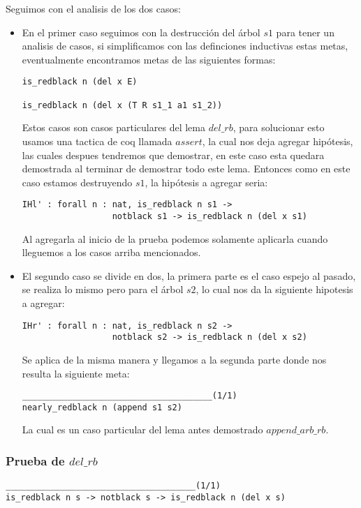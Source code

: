Seguimos con el analisis de los dos casos:
\begin{itemize}
  \item En el primer caso seguimos con la destrucci\'on del \'arbol $s1$ para tener un analisis de
  casos, si simplificamos con las definciones inductivas estas metas, eventualmente encontramos
  metas de las siguientes formas:
\begin{verbatim}
is_redblack n (del x E)

is_redblack n (del x (T R s1_1 a1 s1_2))
\end{verbatim}
  Estos casos son casos particulares del lema $del\_rb$, para solucionar esto usamos una tactica de
  coq llamada $assert$, la cual nos deja agregar hip\'otesis, las cuales despues tendremos que
  demostrar, en este caso esta quedara demostrada al terminar de demostrar todo este lema.
  Entonces como en este caso estamos destruyendo $s1$, la hip\'otesis a agregar seria:
\begin{verbatim}
IHl' : forall n : nat, is_redblack n s1 ->
                  notblack s1 -> is_redblack n (del x s1)
\end{verbatim}
  Al agregarla al inicio de la prueba podemos solamente aplicarla cuando lleguemos a los casos
  arriba mencionados.
  \item El segundo caso se divide en dos, la primera parte es el caso espejo al pasado, se realiza lo mismo pero para el \'arbol $s2$, lo cual nos da la siguiente hipotesis a agregar:
\begin{verbatim}
IHr' : forall n : nat, is_redblack n s2 ->
                  notblack s2 -> is_redblack n (del x s2)
\end{verbatim}
  Se aplica de la misma manera y llegamos a la segunda parte donde nos resulta la siguiente meta:
\begin{verbatim}
______________________________________(1/1)
nearly_redblack n (append s1 s2)
\end{verbatim}
  La cual es un caso particular del lema antes demostrado $append\_arb\_rb$.
\end{itemize}

\subsubsection{Prueba de $del\_rb$}

\begin{verbatim}
______________________________________(1/1)
is_redblack n s -> notblack s -> is_redblack n (del x s)
\end{verbatim}

